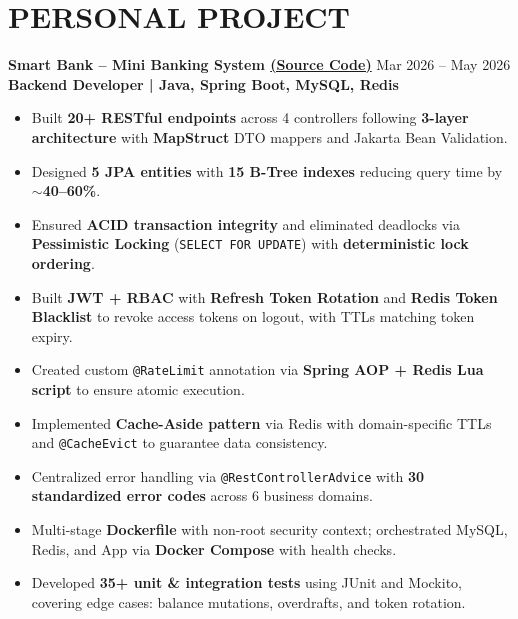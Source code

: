 \documentclass[a4paper,10pt]{article}
\begin{document}
\section*{PERSONAL PROJECT}
\textbf{Smart Bank -- Mini Banking System \href{https://github.com/NguyenNhatUS/SmartBank}{(Source Code)}} \hfill Mar 2026 -- May 2026\\
\textbf{Backend Developer | Java, Spring Boot, MySQL, Redis}
\begin{itemize}
    \item Built \textbf{20+ RESTful endpoints} across 4 controllers following \textbf{3-layer architecture} with \textbf{MapStruct} DTO mappers and Jakarta Bean Validation.
    \item Designed \textbf{5 JPA entities} with \textbf{15 B-Tree indexes} reducing query time by \textbf{$\sim$40--60\%}.
    \item Ensured \textbf{ACID transaction integrity} and eliminated deadlocks via \textbf{Pessimistic Locking} (\texttt{SELECT FOR UPDATE}) with \textbf{deterministic lock ordering}.
    \item Built \textbf{JWT + RBAC} with \textbf{Refresh Token Rotation} and \textbf{Redis Token Blacklist} to revoke access tokens on logout, with TTLs matching token expiry.
    \item Created custom \texttt{@RateLimit} annotation via \textbf{Spring AOP + Redis Lua script} to ensure atomic execution.
    \item Implemented \textbf{Cache-Aside pattern} via Redis with domain-specific TTLs and \texttt{@CacheEvict} to guarantee data consistency.
    \item Centralized error handling via \texttt{@RestControllerAdvice} with \textbf{30 standardized error codes} across 6 business domains.
    \item Multi-stage \textbf{Dockerfile} with non-root security context; orchestrated MySQL, Redis, and App via \textbf{Docker Compose} with health checks.
    \item Developed \textbf{35+ unit \& integration tests} using JUnit and Mockito, covering edge cases: balance mutations, overdrafts, and token rotation.
\end{itemize}
\end{document}
